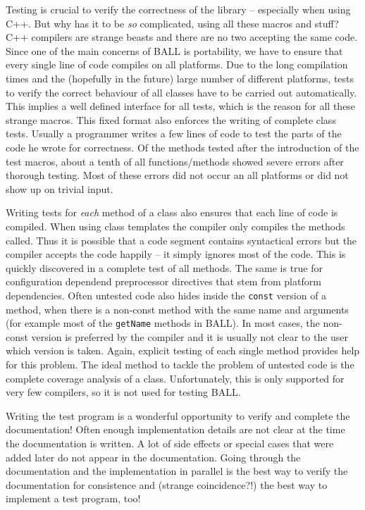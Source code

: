 \documentclass[a4paper,10pt]{article}
\begin{document}
Testing is crucial to verify the correctness of the library -- especially when
using C++. But why has it to be {\em so} complicated, using all these macros
and stuff? C++ compilers are strange beasts and there are no two accepting 
the same code. Since one of the main concerns of BALL is portability, 
we have to ensure that every single line of
code compiles on all platforms. Due to the long compilation times and the
(hopefully in the future) large number of different platforms, tests to verify the
correct behaviour of all classes have to be carried out automatically. This
implies a well defined interface for all tests, which is the reason for all
these strange macros. This fixed format also enforces the writing of complete
class tests. Usually a programmer writes a few lines of code to test the parts
of the code he wrote for correctness. Of the methods tested after the
introduction of the test macros, about a tenth of all functions/methods showed
severe errors after thorough testing. Most of these errors did not occur an
all platforms or did not show up on trivial input.

Writing tests for {\em each} method of a class also ensures that each line of code is
compiled. When using class templates the compiler only compiles the methods
called. Thus it is possible that a code segment contains syntactical errors
but the compiler accepts the code happily -- it simply ignores most of the
code. This is quickly discovered in a complete test of all methods. The same
is true for configuration dependend preprocessor directives that stem from
platform dependencies. Often untested code also hides inside the {\tt const}
version of a method, when there is a non-const method with the same name and
arguments (for example most of the {\tt getName} methods in BALL). In most
cases, the non-const version is preferred by the compiler and it is usually
not clear to the user which version is taken. Again, explicit testing of each
single method provides help for this problem.
The ideal method to tackle the problem of untested code is the complete
coverage analysis of a class. Unfortunately, this is only supported for very
few compilers, so it is not used for testing BALL.

Writing the test program is a wonderful opportunity to verify and complete the
documentation! Often enough implementation details are not clear at the time
the documentation is written. A lot of side effects or special cases that were
added later do not appear in the documentation. Going through the
documentation and the implementation in parallel is the best way to verify the
documentation for consistence and (strange coincidence?!) the best way to
implement a test program, too!
\end{document}
